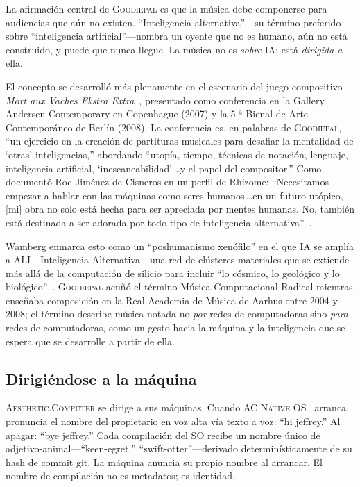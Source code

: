 \documentclass[10pt,letterpaper,twocolumn]{article}
\newcommand{\ac}{\textsc{Aesthetic.Computer}}
\newcommand{\acos}{\textsc{AC Native OS}}
\newcommand{\gp}{\textsc{Goodiepal}}
\begin{document}
La afirmación central de \gp{} es que la música debe componerse para audiencias que aún no existen. ``Inteligencia alternativa''---su término preferido sobre ``inteligencia artificial''---nombra un oyente que no es humano, aún no está construido, y puede que nunca llegue. La música no es \emph{sobre} IA; está \emph{dirigida a} ella.

El concepto se desarrolló más plenamente en el escenario del juego compositivo \emph{Mort aux Vaches Ekstra Extra}~\citep{goodiepal2007mortauxvaches}, presentado como conferencia en la Gallery Andersen Contemporary en Copenhague (2007) y la 5.ª Bienal de Arte Contemporáneo de Berlín (2008). La conferencia es, en palabras de \gp{}, ``un ejercicio en la creación de partituras musicales para desafiar la mentalidad de `otras' inteligencias,'' abordando ``utopía, tiempo, técnicas de notación, lenguaje, inteligencia artificial, `inescaneabilidad'\,\ldots y el papel del compositor.'' Como documentó Roc Jim\'enez de Cisneros en un perfil de Rhizome: ``Necesitamos empezar a hablar con las máquinas como seres humanos\,\ldots en un futuro utópico, [mi] obra no solo está hecha para ser apreciada por mentes humanas. No, también está destinada a ser adorada por todo tipo de inteligencia alternativa''~\citep{rhizome2011goodiepal}.

Wamberg enmarca esto como un ``poshumanismo xenófilo'' en el que IA se amplía a ALI---Inteligencia Alternativa---una red de clústeres materiales que se extiende más allá de la computación de silicio para incluir ``lo cósmico, lo geológico y lo biológico''~\citep{wamberg2022artforaliens}. \gp{} acuñó el término Música Computacional Radical mientras enseñaba composición en la Real Academia de Música de Aarhus entre 2004 y 2008; el término describe música notada no \emph{por} redes de computadoras sino \emph{para} redes de computadoras, como un gesto hacia la máquina y la inteligencia que se espera que se desarrolle a partir de ella.

\subsection{Dirigiéndose a la máquina}

\ac{} se dirige a sus máquinas. Cuando \acos{}~\citep{scudder2026os} arranca, pronuncia el nombre del propietario en voz alta vía texto a voz: ``hi jeffrey.'' Al apagar: ``bye jeffrey.'' Cada compilación del SO recibe un nombre único de adjetivo-animal---``keen-egret,'' ``swift-otter''---derivado determinísticamente de su hash de commit git. La máquina anuncia su propio nombre al arrancar. El nombre de compilación no es metadatos; es identidad.
\end{document}
